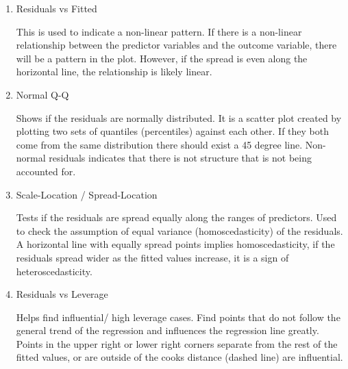\documentclass[
]{article}
\begin{document}
\begin{enumerate}
\def\labelenumi{\arabic{enumi}.}
\item
  Residuals vs Fitted

  This is used to indicate a non-linear pattern. If there is a
  non-linear relationship between the predictor variables and the
  outcome variable, there will be a pattern in the plot. However, if the
  spread is even along the horizontal line, the relationship is likely
  linear.
\item
  Normal Q-Q

  Shows if the residuals are normally distributed. It is a scatter plot
  created by plotting two sets of quantiles (percentiles) against each
  other. If they both come from the same distribution there should exist
  a 45 degree line. Non-normal residuals indicates that there is not
  structure that is not being accounted for.
\item
  Scale-Location / Spread-Location

  Tests if the residuals are spread equally along the ranges of
  predictors. Used to check the assumption of equal variance
  (homoscedasticity) of the residuals. A horizontal line with equally
  spread points implies homoscedasticity, if the residuals spread wider
  as the fitted values increase, it is a sign of heteroscedasticity.
\item
  Residuals vs Leverage

  Helps find influential/ high leverage cases. Find points that do not
  follow the general trend of the regression and influences the
  regression line greatly. Points in the upper right or lower right
  corners separate from the rest of the fitted values, or are outside of
  the cooks distance (dashed line) are influential.
\end{enumerate}
\end{document}
